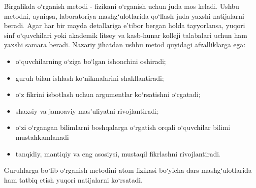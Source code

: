 \documentclass[epsf]{article}
\begin{document}
Birgalikda o`rganish metodi - fizikani o`rganish uchun juda mos keladi. Ushbu metodni, ayniqsa, laboratoriya mashg`ulotlarida qo`llash juda yaxshi natijalarni beradi. Agar har bir mayda detallariga e'tibor bergan holda tayyorlansa, yuqori sinf o`quvchilari yoki akademik litsey va kasb-hunar kolleji talabalari uchun ham yaxshi samara beradi. Nazariy jihatdan ushbu metod quyidagi afzalliklarga ega:
\begin{itemize}
	\item o`quvchilarning o`ziga bo`lgan ishonchini oshiradi;
	\item guruh bilan ishlash ko`nikmalarini shakllantiradi;
	\item o`z fikrini isbotlash uchun argumentlar ko`rsatishni o`rgatadi;
	\item shaxsiy va jamoaviy mas'uliyatni rivojlantiradi;
	\item o`zi o`rgangan bilimlarni boshqalarga o`rgatish orqali o`quvchilar bilimi mustahkamlanadi
	\item tanqidiy, mantiqiy va eng asosiysi, mustaqil fikrlashni rivojlantiradi. 
\end{itemize}

Guruhlarga bo`lib o`rganish metodini atom fizikasi bo`yicha dars mashg`ulotlarida ham tatbiq etish yuqori natijalarni ko`rsatadi.
 
\newpage
\end{document}
